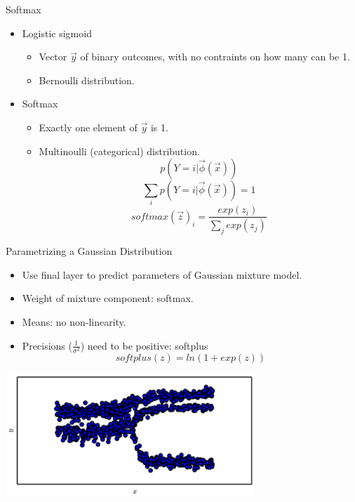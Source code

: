 
\begin{vbframe}{Softmax}

\vfill

\begin{itemize}
\item Logistic sigmoid \\
\begin{itemize}
\item Vector $\vec y$ of binary outcomes, with no contraints on how many can be 1.
\item Bernoulli distribution.
\end{itemize}
\item Softmax
\begin{itemize}
\item Exactly one element of $\vec y$ is 1.
\item Multinoulli (categorical) distribution.
$$p(Y = i| \vec{\phi}(\vec x))$$
$$\sum_i p(Y = i| \vec{\phi}(\vec x)) = 1$$
$$softmax(\vec z)_i = \frac{exp(z_i)}{\sum_j exp(z_j)}$$
\end{itemize}
\end{itemize}
\begin{center}
\end{center}

\vfill

\end{vbframe}



\begin{vbframe}{Parametrizing a Gaussian Distribution}

\vfill

\begin{itemize}
\item Use final layer to predict parameters of Gaussian mixture model.
\item Weight of mixture component: softmax.
\item Means: no non-linearity.
\item Precisions ($\frac{1}{\sigma^2}$) need to be positive: softplus
$$softplus(z) = ln(1+exp(z))$$
\end{itemize}
\begin{center}
\includegraphics[width = 0.7\textwidth]{./figure/gaussian_mixture_samples}
\end{center}

\vfill

\end{vbframe}


